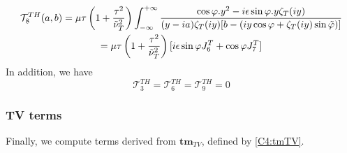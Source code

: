 \begin{multline}
\mathcal{T}_8^{TH}(a,b)=\mu\tau\left(1+\frac{\tau^2}{\nuti_T^2}\right)\int_{-\infty}^{+\infty} \frac{\cos\varphi.y^2-i\epsilon\sin\varphi.y\zeta_T(iy)}{(y-ia)\zeta_T(iy)\lbrack b-(iy\cos \varphi+ \zeta_T(iy)\sin\phiti) \rbrack}\\
\hfill =\mu\tau\left(1+\frac{\tau^2}{\nuti_T^2}\right)\lbrack i\epsilon\sin\varphi J_6^T+\cos\varphi J_7^T\rbrack  \hfill
\end{multline}
In addition, we have
$$ \mathcal{T}_3^{TH}=\mathcal{T}_6^{TH}=\mathcal{T}_9^{TH}=0 $$

\subsubsection{TV terms}
Finally, we compute terms derived from $\mathbf{tm}_{TV}$, defined by \eqref{C4:tmTV}.

